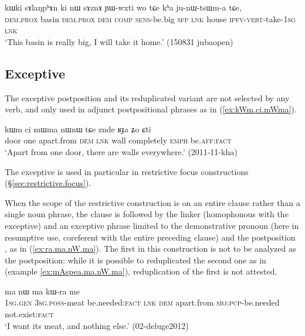 \begin{exe}
\ex \label{ex:nW.sAznA.YWwxti}
\gll kɯki sɤlaŋpʰɤn ki nɯ sɤznɤ ɲɯ-wxti wo tɕe kʰa ju-nɯ-tsɯm-a tɕe, \\
\textsc{dem}.\textsc{prox} basin \textsc{dem}.\textsc{prox}  \textsc{dem} \textsc{comp}  \textsc{sens}-be.big \textsc{sfp} \textsc{lnk} house \textsc{ipfv}-\textsc{vert}-take-\textsc{1sg} \textsc{lnk} \\
\glt `This basin is really big, I will take it home.' (150831 jubaopen)
\end{exe}

\subsection{Exceptive} \label{sec:exceptive} 
The exceptive postposition  and its reduplicated variant  are not selected by any verb, and only used in adjunct postpositional phrases as in (\ref{ex:kWm.ci.mWma}).

 \begin{exe}
 \ex \label{ex:kWm.ci.mWma}
 \gll kɯm ci mɯma nɯnɯ tɕe znde ʁɟa ʑo ɕti \\
 door one apart.from \textsc{dem} \textsc{lnk} wall completely \textsc{emph} be.\textsc{aff}:\textsc{fact} \\
 \glt `Apart from one door, there are walls everywhere.' (2011-11-kha)
\end{exe}

The exceptive  is used in particular in restrictive focus constructions (§\ref{sec:restrictive.focus}).

When the scope of the restrictive construction is on an entire clause rather than a single noun phrase, the clause is followed by the linker  (homophonous with the exceptive) and an exceptive phrase limited to the demonstrative pronoun  (here in resumptive use, coreferent with the entire preceding clause) and the postposition , as in (\ref{ex:ra.ma.nW.ma}). The first  in this construction is not to be analyzed as the postposition: while it is possible to reduplicated the second one as in  (example \ref{ex:mAspea.ma.nW.ma}), reduplication of the first  is not attested.

 \begin{exe}
 \ex \label{ex:ra.ma.nW.ma}
 \gll [aʑɯɣ ɯ-ɕa ra] ma nɯ ma kɯ-ra me \\
 \textsc{1sg}.\textsc{gen} \textsc{3sg}.\textsc{poss}-meat be.needed:\textsc{fact} \textsc{lnk} \textsc{dem} apart.from \textsc{sbj}:\textsc{pcp}-be.needed not.exist:\textsc{fact} \\
 \glt `I want its meat, and nothing else.' (02-deluge2012)
\end{exe}

